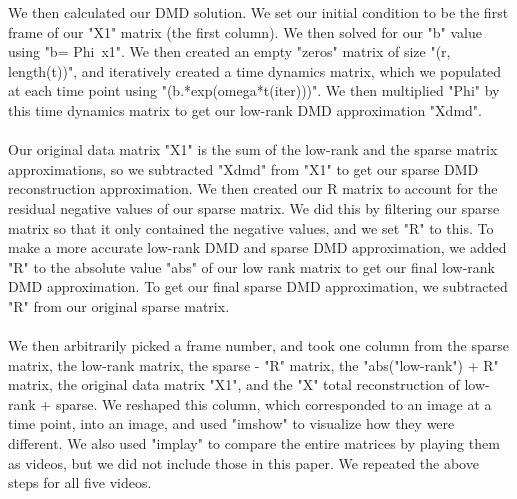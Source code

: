 \documentclass{article}
\begin{document}
We then calculated our DMD solution. We set our initial condition to be the first frame of our "X1" matrix (the first column). We then solved for our "b" value using "b= Phi\ x1". We then created an empty "zeros" matrix of size "(r, length(t))", and iteratively created a time dynamics matrix, which we populated at each time point using "(b.*exp(omega*t(iter)))". We then multiplied "Phi" by this time dynamics matrix to get our low-rank DMD approximation "Xdmd". \\ \\ 
Our original data matrix "X1" is the sum of the low-rank and the sparse matrix approximations, so we subtracted "Xdmd" from "X1" to get our sparse DMD reconstruction approximation. We then created our R matrix to account for the residual negative values of our sparse matrix. We did this by filtering our sparse matrix so that it only contained the negative values, and we set "R" to this. To make a more accurate low-rank DMD and sparse DMD approximation, we added "R" to the absolute value "abs" of our low rank matrix to get our final low-rank DMD approximation. To get our final sparse DMD approximation, we subtracted "R" from our original sparse matrix. \\ \\ 
We then arbitrarily picked a frame number, and took one column from the sparse matrix, the low-rank matrix, the sparse - "R" matrix, the "abs("low-rank") + R" matrix, the original data matrix "X1", and the "X" total reconstruction of low-rank + sparse.  We reshaped this column, which corresponded to an image at a time point, into an image, and used "imshow" to visualize how they were different. We also used "implay" to compare the entire matrices by playing them as videos, but we did not include those in this paper. We repeated the above steps for all five videos.
\end{document}
